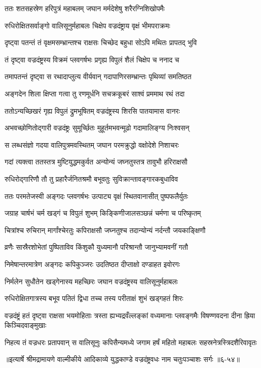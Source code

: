 \twolineshloka
{ततः शतसहस्रेण हरिपुत्रं महाबलम्}
{जघान मर्मदेशेषु शरैरग्निशिखोपमैः} %

\twolineshloka
{रुधिरोक्षितसर्वाङ्गो वालिसूनुर्महाबलः}
{चिक्षेप वज्रदंष्ट्राय वृक्षं भीमपराक्रमः} %

\twolineshloka
{दृष्ट्वा पतन्तं तं वृक्षमसम्भ्रान्तश्च राक्षसः}
{चिच्छेद बहुधा सोऽपि मथितः प्रापतद् भुवि} %

\twolineshloka
{तं दृष्ट्वा वज्रदंष्ट्रस्य विक्रमं प्लवगर्षभः}
{प्रगृह्य विपुलं शैलं चिक्षेप च ननाद च} %

\twolineshloka
{तमापतन्तं दृष्ट्वा स रथादाप्लुत्य वीर्यवान्}
{गदापाणिरसम्भ्रान्तः पृथिव्यां समतिष्ठत} %

\twolineshloka
{अङ्गदेन शिला क्षिप्ता गत्वा तु रणमूर्धनि}
{सचक्रकूबरं साश्वं प्रममाथ रथं तदा} %

\twolineshloka
{ततोऽन्यच्छिखरं गृह्य विपुलं द्रुमभूषितम्}
{वज्रदंष्ट्रस्य शिरसि पातयामास वानरः} %

\twolineshloka
{अभवच्छोणितोद्गारी वज्रदंष्ट्रः सुमूर्च्छितः}
{मुहूर्तमभवन्मूढो गदामालिङ्ग्य निःश्वसन्} %

\twolineshloka
{स लब्धसंज्ञो गदया वालिपुत्रमवस्थितम्}
{जघान परमक्रुद्धो वक्षोदेशे निशाचरः} %

\twolineshloka
{गदां त्यक्त्वा ततस्तत्र मुष्टियुद्धमकुर्वत}
{अन्योन्यं जघ्नतुस्तत्र तावुभौ हरिराक्षसौ} %

\twolineshloka
{रुधिरोद्गारिणौ तौ तु प्रहारैर्जनितश्रमौ}
{बभूवतुः सुविक्रान्तावङ्गारकबुधाविव} %

\twolineshloka
{ततः परमतेजस्वी अङ्गदः प्लवगर्षभः}
{उत्पाट्य वृक्षं स्थितवानासीत् पुष्पफलैर्युतः} %

\twolineshloka
{जग्राह चार्षभं चर्म खड्गं च विपुलं शुभम्}
{किङ्किणीजालसञ्छन्नं चर्मणा च परिष्कृतम्} %

\twolineshloka
{चित्रांश्च रुचिरान् मार्गांश्चेरतुः कपिराक्षसौ}
{जघ्नतुश्च तदान्योन्यं नर्दन्तौ जयकाङ्क्षिणौ} %

\twolineshloka
{व्रणैः सास्रैरशोभेतां पुष्पिताविव किंशुकौ}
{युध्यमानौ परिश्रान्तौ जानुभ्यामवनीं गतौ} %

\twolineshloka
{निमेषान्तरमात्रेण अङ्गदः कपिकुञ्जरः}
{उदतिष्ठत दीप्ताक्षो दण्डाहत इवोरगः} %

\twolineshloka
{निर्मलेन सुधौतेन खड्गेनास्य महच्छिरः}
{जघान वज्रदंष्ट्रस्य वालिसूनुर्महाबलः} %

\twolineshloka
{रुधिरोक्षितगात्रस्य बभूव पतितं द्विधा}
{तच्च तस्य परीताक्षं शुभं खड्गहतं शिरः} %

\threelineshloka
{वज्रदंष्ट्रं हतं दृष्ट्वा राक्षसा भयमोहिताः}
{त्रस्ता ह्यभ्यद्रवँल्लङ्कां वध्यमानाः प्लवङ्गमैः}
{विषण्णवदना दीना ह्रिया किञ्चिदवाङ्मुखाः} %

\twolineshloka
{निहत्य तं वज्रधरः प्रतापवान् स वालिसूनुः कपिसैन्यमध्ये}
{जगाम हर्षं महितो महाबलः सहस्रनेत्रस्त्रिदशैरिवावृतः} %


॥इत्यार्षे श्रीमद्रामायणे वाल्मीकीये आदिकाव्ये युद्धकाण्डे वज्रदंष्ट्रवधः नाम चतुःपञ्चाशः सर्गः ॥६-५४॥
